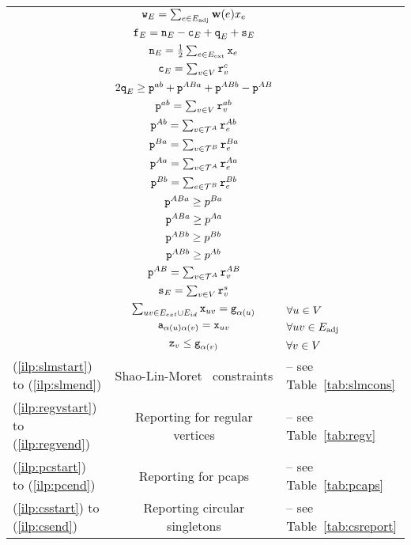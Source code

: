 \begin{algorithm}[tbh]
\begin{constraints}
\begin{tabular}{lcl}
    \cns & ${\texttt{w}}_E = \sum_{e \in {E}_\text{adj}} \mathbf{w}(e) x_e$\\
	\cns & ${\texttt{f}}_E = {\texttt{n}}_E - {\texttt{c}}_E + {\texttt{q}}_E + {\texttt{s}}_E$\\
    \cns & ${\texttt{n}}_E = \frac{1}{2} \sum_{e \in {E}_{\text{ext}}} {\texttt{x}}_{e}$\\
    \cns & ${\texttt{c}}_E = \sum_{v\in V} {\texttt{r}}^c_v$\\
    \cns & $2{\texttt{q}}_E \geq {\texttt{p}}^{a b}+ {\texttt{p}}^{ABa} + {\texttt{p}}^{ABb} - {\texttt{p}}^{A B} $\\
    \cns & ${\texttt{p}}^{a b} = \sum_{v \in V}{\texttt{r}}^{a b}_v$\\
    \cns & ${\texttt{p}}^{A b} = \sum_{v \in \mathcal{T}^A} {\texttt{r}}^{A b}_e$\\
    \cns & ${\texttt{p}}^{B a} = \sum_{v\in \mathcal{T}^B} {\texttt{r}}^{B a}_e$\\
    \cns & ${\texttt{p}}^{A a} = \sum_{v \in \mathcal{T}^A} {\texttt{r}}^{A a}_e$\\
    \cns & ${\texttt{p}}^{B b} = \sum_{e \in \mathcal{T}^B} {\texttt{r}}^{B b}_e$\\
    \cns & ${\texttt{p}}^{ABa} \geq p^{B a}$\\
    \cns & ${\texttt{p}}^{ABa} \geq p^{A a}$\\
    \cns & ${\texttt{p}}^{ABb} \geq p^{B b}$\\
    \cns & ${\texttt{p}}^{ABb} \geq p^{A b}$\\
    \cns & ${\texttt{p}}^{A B} = \sum_{v\in \mathcal{T}^A} {\texttt{r}}^{A B}_v$\\
    \cns & ${\texttt{s}}_E = \sum_{v\in V} {\texttt{r}}^{s}_{v}$ \\
    \cns & $\sum_{uv\in E_{ext} \cup E_{id} } {\texttt{x}}_{uv}= {\texttt{g}}_{\alpha(u)}$ & $\forall u\in V$  \\
    \cns & ${\texttt{a}}_{\alpha(u)\alpha(v)} = {\texttt{x}}_{uv}$ & $\forall uv \in {E}_\text{adj}$ \\
    \cns & ${\texttt{z}}_{v} \leq {\texttt{g}}_{\alpha (v)}$ & $\forall v \in V$ \\
    (\ref{ilp:slmstart}) to (\ref{ilp:slmend})& Shao-Lin-Moret~\cite{SHA-LIN-MOR-2015} constraints& -- see Table~\ref{tab:slmcons}\\
    (\ref{ilp:regvstart}) to (\ref{ilp:regvend})& Reporting for regular vertices& -- see Table~\ref{tab:regv}\\
    (\ref{ilp:pcstart}) to (\ref{ilp:pcend})& Reporting for \gls{pcaps}& -- see Table~\ref{tab:pcaps}\\
    (\ref{ilp:csstart}) to (\ref{ilp:csend})& Reporting circular singletons& --  see Table~\ref{tab:csreport}\\    
\end{tabular}

\end{constraints}
\end{algorithm}

